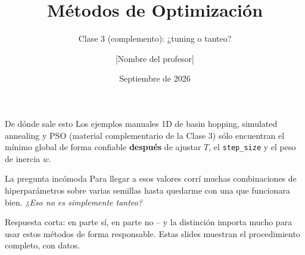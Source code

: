 \documentclass[aspectratio=169,10pt]{beamer}
\title{Métodos de Optimización}
\subtitle{Clase 3 (complemento): ¿tuning o tanteo?}
\author{[Nombre del profesor]}
\institute{Programa de Maestría, [Nombre de la universidad / programa]}
\date{Septiembre de 2026}
\begin{document}
\begin{frame}[plain]
  \maketitle
\end{frame}

\begin{frame}{De dónde sale esto}
  Los ejemplos manuales 1D de basin hopping, simulated annealing y PSO
  (material complementario de la Clase 3) sólo encuentran el mínimo
  global de forma confiable \textbf{después} de ajustar $T$, el
  \texttt{step\_size} y el peso de inercia $w$.
  \begin{alertblock}{La pregunta incómoda}
    Para llegar a esos valores corrí muchas combinaciones de
    hiperparámetros sobre varias semillas hasta quedarme con una que
    funcionara bien. \emph{¿Eso no es simplemente tanteo?}
  \end{alertblock}
  Respuesta corta: en parte sí, en parte no -- y la distinción importa
  mucho para usar estos métodos de forma responsable. Estas slides
  muestran el procedimiento completo, con datos.
\end{frame}
\end{document}
